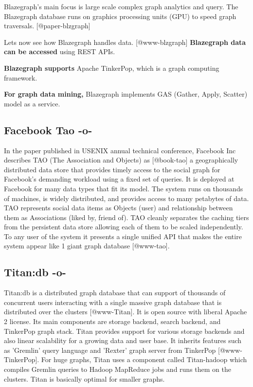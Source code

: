 Blazegraph's main focus is large scale complex graph analytics and
query.  The Blazegraph database runs on graphics processing units
(GPU) to speed graph traversals. [@paper-blzgraph]

Lets now see how Blazegraph handles data. [@www-blzgraph] {\bf
Blazegraph data can be accessed} using REST APIs.

{\bf Blazegraph supports} Apache TinkerPop, which is a graph computing
 framework.

{\bf For graph data mining,} Blazegraph implements GAS (Gather, Apply,
Scatter) model as a service.



\subsection{Facebook Tao -o-}

In the paper published in USENIX annual technical conference, Facebook
Inc describes TAO (The Association and Objects) as [@book-tao] a
geographically distributed data store that provides timely access to
the social graph for Facebook's demanding workload using a fixed set
of queries. It is deployed at Facebook for many data types that fit
its model. The system runs on thousands of machines, is widely
distributed, and provides access to many petabytes of data. TAO
represents social data items as Objects (user) and relationship
between them as Associations (liked by, friend of).  TAO cleanly
separates the caching tiers from the persistent data store allowing
each of them to be scaled independently. To any user of the system it
presents a single unified API that makes the entire system appear like
1 giant graph database [@www-tao].



\subsection{Titan:db -o-}

Titan:db is a distributed graph database that can support of thousands
of concurrent users interacting with a single massive graph database
that is distributed over the clusters [@www-Titan]. It is open
source with liberal Apache 2 license. Its main components are storage
backend, search backend, and TinkerPop graph stack. Titan provides
support for various  storage backends and also linear scalability for
a growing data and user base. It inherits features such as 'Gremlin'
query language and 'Rexter' graph server from
TinkerPop [@www-TinkerPop].  For huge graphs, Titan uses a
component called Titan-hadoop which compiles Gremlin queries to Hadoop
MapReduce jobs and runs them on the clusters. Titan is basically
optimal for smaller graphs.



